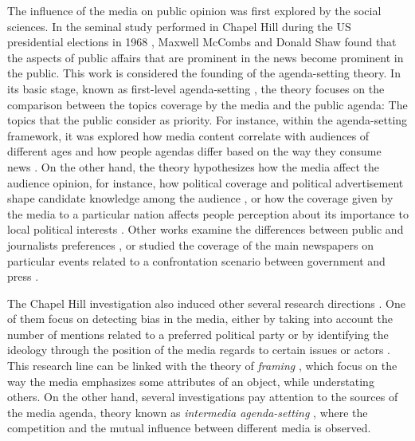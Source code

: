 \documentclass{bmcart}
\begin{document}
\par The influence of the media on public opinion was first explored by the social sciences. 
In the seminal study performed in Chapel Hill during the US presidential elections in 1968 \cite{mccombs1972agenda}, Maxwell McCombs and Donald Shaw found that the aspects of public affairs that are prominent in the news become prominent in the public. This work is considered the founding of the agenda-setting theory.
In its basic stage, known as first-level agenda-setting \cite{mccombs2005look}, the theory focuses on the comparison between the topics coverage by the media and the public agenda: The topics that the public consider as priority.
For instance, within the agenda-setting framework, it was explored how media content correlate with audiences of different ages \cite{coleman2007young} and how people agendas differ based on the way they consume news \cite{althaus2002agenda}.
On the other hand, the theory hypothesizes how the media affect the audience opinion, for instance, how political coverage and political advertisement shape candidate knowledge among the audience \cite{brians1996campaign, gerber2009does}, or how the coverage given by the media to a particular nation affects people perception about its importance to local political interests \cite{wanta2004agenda}.
Other works examine the differences between public and journalists preferences \cite{mitchelstein2016brecha}, or studied the coverage of the main newspapers on particular events related to a confrontation scenario between government and press \cite{zunino2010cobertura, koziner2013cobertura}.


\par The Chapel Hill investigation also induced other several research directions \cite{mccombs2005look}.
One of them focus on detecting bias in the media, either by taking into account the number of mentions related  to a preferred political party \cite{lazaridou2016identifying, baumgartner2015all} or by identifying the ideology through the position of the media regards to certain issues or actors \cite{elejalde2018nature, sagarzazu2017hugo}. 
This research line can be linked with the theory of \textit{framing} \cite{guggenheim2015dynamics, tsur2015frame}, which focus on the way the media emphasizes some attributes of an object, while understating others. 
On the other hand, several investigations pay attention to the sources of the media agenda, theory known as \textit{intermedia agenda-setting} \cite{vargo2017networks, harder2017intermedia, guo2017global}, where the competition and the mutual influence between different media is observed.
\end{document}
